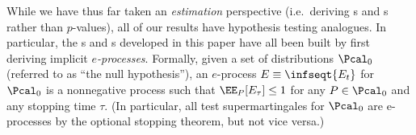 While we have thus far taken an \emph{estimation} perspective (i.e.~deriving \cs{}s and \ci{}s rather than $p$-values), all of our results have hypothesis testing analogues. In particular, the \cs{}s and \ci{}s developed in this paper have all been built by first deriving implicit \emph{$e$-processes}.
Formally, given a set of distributions $\Pcal_0$ (referred to as ``the null hypothesis''), an $e$-process $E \equiv \infseqt{E_t}$ for $\Pcal_0$ is a nonnegative process such that $\EE_P[E_\tau] \leq 1$ for any $P \in \Pcal_0$ and any stopping time $\tau$. (In particular, all test supermartingales for $\Pcal_0$ are e-processes by the optional stopping theorem, but not vice versa.)

